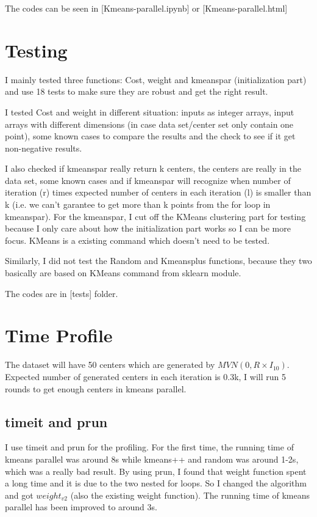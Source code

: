 \documentclass{article}
\begin{document}
\vspace{2 mm}
The codes can be seen in [Kmeans-parallel.ipynb] or [Kmeans-parallel.html]
\section{Testing}
I mainly tested three functions: Cost, weight and kmeanspar (initialization part) and use 18 tests to make sure they are robust and get the right result. 

\vspace{2 mm}
I tested Cost and weight in different situation: inputs as integer arrays, input arrays with different dimensions (in case data set/center set only contain one point), some known cases to compare the results and the check to see if it get non-negative results. 

\vspace{2 mm}
I also checked if kmeanspar really return k centers, the centers are really in the data set, some known cases and if kmeanspar will recognize when number of iteration (r) times expected number of centers in each iteration (l) is smaller than k (i.e. we can't garantee to get more than k points from the for loop in kmeanspar). For the kmeanspar, I cut off the KMeans clustering part for testing because I only care about how the initialization part works so I can be more focus. KMeans is a existing command which doesn't need to be tested. 

\vspace{2 mm}
Similarly, I did not test the Random and Kmeansplus functions, because they two basically are based on KMeans command from sklearn module.

\vspace{2 mm}
The codes are in [tests] folder.

\section{Time Profile}
The dataset will have 50 centers which are generated by $MVN(0,R\times I_{10})$. Expected number of generated centers in each iteration is 0.3k, I will run 5 rounds to get enough centers in kmeans parallel.
\subsection{timeit and prun}
I use timeit and prun for the profiling. For the first time, the running time of kmeans parallel was around 8s while kmeans++ and random was around 1-2s, which was a really bad result. By using prun, I found that weight function spent a long time and it is due to the two nested for loops. So I changed the algorithm and got $weight_{v2}$ (also the existing weight function). The running time of kmeans parallel has been improved to around 3s.
\end{document}
